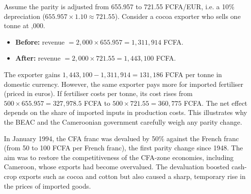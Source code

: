 \documentclass[11pt]{article}
\newcounter{popsec}
\newcounter{popsub}
\newcommand{\courssub}[1]{%
  \stepcounter{popsub}%
  \par\vspace{9pt}\noindent{\popxbold\fontsize{11.5}{13}\selectfont\color{popink}{\color{poporange}\thepopsec.\thepopsub}\hspace{6pt}#1}\par\nopagebreak\vspace{4pt}
}
\begin{document}
\begin{experience}
Assume the parity is adjusted from 655.957 to 721.55 FCFA/EUR, i.e. a 10\% depreciation ($655.957 \times 1.10 \approx 721.55$). Consider a cocoa exporter who sells one tonne at ,000.
\begin{itemize}
\item \textbf{Before:} revenue $= 2,000 \times 655.957 = 1,311,914$ FCFA.
\item \textbf{After:} revenue $= 2,000 \times 721.55 = 1,443,100$ FCFA.
\end{itemize}
The exporter gains $1,443,100 - 1,311,914 = 131,186$ FCFA per tonne in domestic currency. However, the same exporter pays more for imported fertiliser (priced in euros). If fertiliser costs  per tonne, its cost rises from $500 \times 655.957 = 327,978.5$ FCFA to $500 \times 721.55 = 360,775$ FCFA. The net effect depends on the share of imported inputs in production costs. This illustrates why the BEAC and the Cameroonian government carefully weigh any parity change.
\end{experience}

\begin{savaistu}
In January 1994, the CFA franc was devalued by 50\% against the French franc (from 50 to 100 FCFA per French franc), the first parity change since 1948. The aim was to restore the competitiveness of the CFA-zone economies, including Cameroon, whose exports had become overvalued. The devaluation boosted cash-crop exports such as cocoa and cotton but also caused a sharp, temporary rise in the prices of imported goods.
\end{savaistu}

\courssub{Summary of Key Points}
\end{document}
